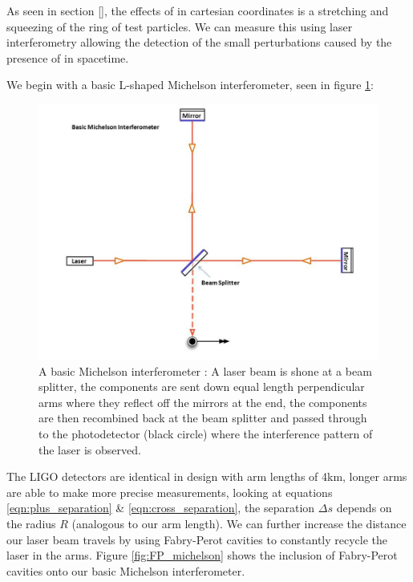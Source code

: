 As seen in section \ref{}, the effects of \gws in cartesian coordinates is a stretching and squeezing of the ring of test particles. We can measure this using laser interferometry allowing the detection of the small
perturbations caused by the presence of \gws in spacetime.

We begin with a basic L-shaped Michelson interferometer, seen in figure \ref{fig:basic_michelson}:

\begin{figure}
   \includegraphics[width=\textwidth]{images/1_general_relativity/Basic_michelson_labeled.jpg}
   \caption{\label{fig:basic_michelson}A basic Michelson interferometer \cite{ligo_ifo}: A laser beam is shone at a beam splitter, the components are sent down equal length perpendicular arms where they reflect off the mirrors at the end, the components are then recombined back at the beam splitter and passed through to the photodetector (black circle) where the interference pattern of the laser is observed.}
\end{figure}

The LIGO detectors are identical in design with arm lengths of 4km, longer arms are able to make more precise measurements, looking at equations \ref{eqn:plus_separation} \& \ref{eqn:cross_separation}, the separation
$\Delta s$ depends on the radius $R$ (analogous to our arm length). We can further increase the distance our laser beam travels by using Fabry-Perot cavities to constantly recycle the laser in the arms. Figure \ref{fig:FP_michelson} shows the inclusion of Fabry-Perot cavities onto our basic Michelson interferometer.

